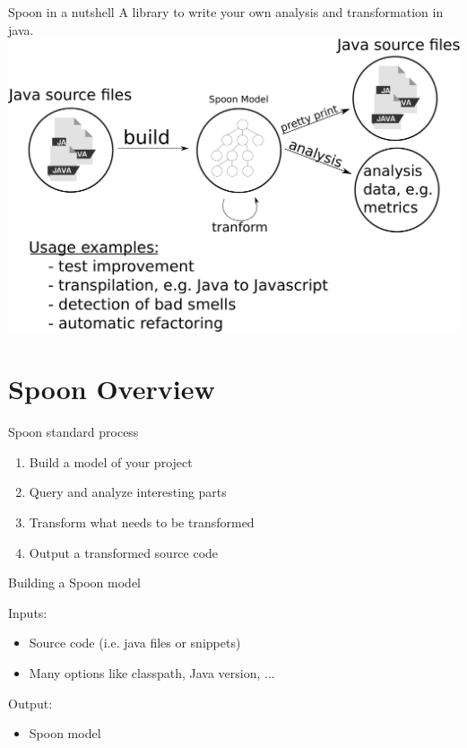 \documentclass{beamer}
\begin{document}
\begin{frame}{Spoon in a nutshell}
\centering
A library to write your own analysis and transformation in java.\\
\vspace{10px}
\includegraphics[scale=0.32]{figures/overview-1.pdf}
\end{frame}



\section{Spoon Overview}

\begin{frame}{Spoon standard process}

\begin{enumerate}
\item Build a model of your project
\item Query and analyze interesting parts
\item Transform what needs to be transformed
\item Output a transformed source code
\end{enumerate}

\end{frame}

\begin{frame}{Building a Spoon model}

Inputs:
\begin{itemize}
\item Source code (i.e. java files or snippets)
\item Many options like classpath, Java version, ...
\end{itemize}

Output:
\begin{itemize}
\item Spoon model
\end{itemize}
\end{frame}
\end{document}
